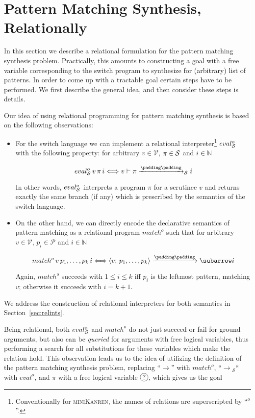 \section{Pattern Matching Synthesis, Relationally}
\label{sec:relationally}

In this section we describe a relational formulation for the pattern matching synthesis problem. Practically,
this amounts to constructing a goal with a free variable corresponding to the switch program to synthesize
for (arbitrary) list of patterns. In order to come up with a tractable goal certain steps have to be performed.
We first describe the general idea, and then consider these steps is details.

Our idea of using relational programming for pattern matching synthesis is based on the following observations:

\begin{itemize}
\item For the switch language we can implement a relational interpreter\footnote{Conventionally for \textsc{miniKanren},
  the names of relations are superscripted by ``$^o$''.} $eval^o_{\mathcal{S}}$ with the following property: for
  arbitrary $v\in\mathcal V$, $\pi\in\mathcal{S}$ and $i\in\mathbb N$
 
  \[
  \setarrow{\xrightarrow}
  \setsubarrow{_\ir}
   eval^o_\ir\, v\, \pi\, i \Longleftrightarrow \withenv{v}{\trans{\pi}{}{i}}
  \]

  In other words, $eval^o_{\mathcal{S}}$ interprets a program $\pi$ for a scrutinee $v$ and returns exactly the same branch (if any)
  which is prescribed by the semantics of the switch language. 
  
\item On the other hand, we can directly encode the declarative semantics of pattern matching as a relational
  program $match^o$ such that for arbitrary $v\in\mathcal V$, $p_i\in\mathcal P$ and $i\in\mathbb N$

  \[
  \setarrow{\xrightarrow}
  match^o\,v\,p_1,\dots,p_k\,i \Longleftrightarrow \trans{\inbr{v;\,p_1,\dots,p_k}}{}{i}
  \]

  Again, $match^o$ succeeds with $1\le i\le k$ iff $p_i$ is the leftmost pattern, matching $v$; otherwise it
  succeeds with $i=k+1$.
\end{itemize}

We address the construction of relational interpreters for both semantics in Section~\ref{sec:relints}.

Being relational, both $eval^o_{\mathcal{S}}$ and $match^o$ do not just succeed or fail for ground arguments, but also can be \emph{queried} for
arguments with free logical variables, thus performing a search for all substitutions for these variables which make the
relation hold. This observation leads us to the idea of utilizing the definition of the pattern matching
synthesis problem, replacing ``$\xrightarrow{}{}\!\!$'' with $match^o$, ``$\xrightarrow{}{}_{\!\!\!\mathcal S}$`` with $eval^o$,
and $\pi$ with a free logical variable $\circled{?}$, which gives us the goal

